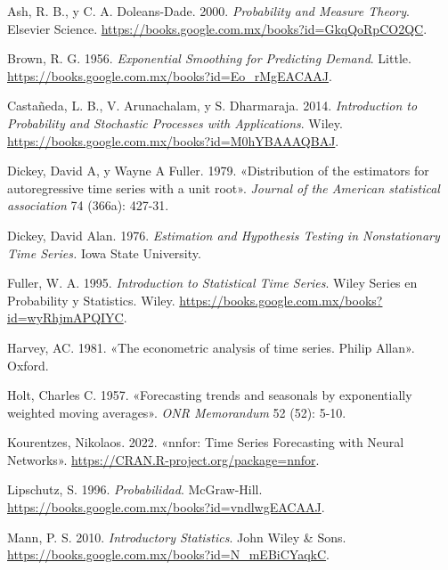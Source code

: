 \documentclass[
  us-letterpaper,
]{scrreprt}
\newlength{\cslhangindent}
\newenvironment{CSLReferences}[2] %
 {\begin{list}{}{%
  \setlength{\itemindent}{0pt}
  \setlength{\leftmargin}{0pt}
  \setlength{\parsep}{0pt}
  \ifodd #1
   \setlength{\leftmargin}{\cslhangindent}
   \setlength{\itemindent}{-1\cslhangindent}
  \fi
  \setlength{\itemsep}{#2\baselineskip}}}
 {\end{list}}
\theoremstyle{plain}
\theoremstyle{definition}
\theoremstyle{definition}
\theoremstyle{plain}
\theoremstyle{remark}
\begin{document}
\label{refs}
\begin{CSLReferences}{1}{0}
Ash, R. B., y C. A. Doleans-Dade. 2000. \emph{Probability and Measure
Theory}. Elsevier Science.
\url{https://books.google.com.mx/books?id=GkqQoRpCO2QC}.

Brown, R. G. 1956. \emph{Exponential Smoothing for Predicting Demand}.
Little. \url{https://books.google.com.mx/books?id=Eo_rMgEACAAJ}.

Castañeda, L. B., V. Arunachalam, y S. Dharmaraja. 2014.
\emph{Introduction to Probability and Stochastic Processes with
Applications}. Wiley.
\url{https://books.google.com.mx/books?id=M0hYBAAAQBAJ}.

Dickey, David A, y Wayne A Fuller. 1979. {«Distribution of the
estimators for autoregressive time series with a unit root»}.
\emph{Journal of the American statistical association} 74 (366a):
427-31.

Dickey, David Alan. 1976. \emph{Estimation and Hypothesis Testing in
Nonstationary Time Series.} Iowa State University.

Fuller, W. A. 1995. \emph{Introduction to Statistical Time Series}.
Wiley Series en Probability y Statistics. Wiley.
\url{https://books.google.com.mx/books?id=wyRhjmAPQIYC}.

Harvey, AC. 1981. {«The econometric analysis of time series. Philip
Allan»}. Oxford.

Holt, Charles C. 1957. {«Forecasting trends and seasonals by
exponentially weighted moving averages»}. \emph{ONR Memorandum} 52 (52):
5-10.

Kourentzes, Nikolaos. 2022. {«nnfor: Time Series Forecasting with Neural
Networks»}. \url{https://CRAN.R-project.org/package=nnfor}.

Lipschutz, S. 1996. \emph{Probabilidad}. McGraw-Hill.
\url{https://books.google.com.mx/books?id=vndlwgEACAAJ}.

Mann, P. S. 2010. \emph{Introductory Statistics}. John Wiley \& Sons.
\url{https://books.google.com.mx/books?id=N_mEBiCYaqkC}.


\end{CSLReferences}
\end{document}
